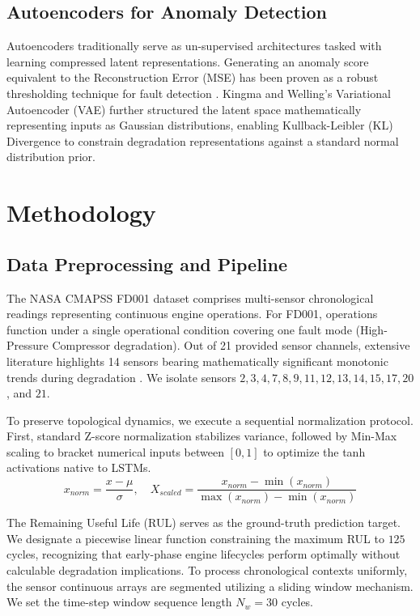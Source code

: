 \documentclass[conference]{IEEEtran}
\begin{document}
\subsection{Autoencoders for Anomaly Detection}
Autoencoders traditionally serve as un-supervised architectures tasked with learning compressed latent representations. Generating an anomaly score equivalent to the Reconstruction Error (MSE) has been proven as a robust thresholding technique for fault detection \cite{autoencoder_anomaly}. Kingma and Welling's Variational Autoencoder (VAE) \cite{vae_kl} further structured the latent space mathematically representing inputs as Gaussian distributions, enabling Kullback-Leibler (KL) Divergence to constrain degradation representations against a standard normal distribution prior.

\section{Methodology}
\subsection{Data Preprocessing and Pipeline}
The NASA CMAPSS FD001 dataset comprises multi-sensor chronological readings representing continuous engine operations. For FD001, operations function under a single operational condition covering one fault mode (High-Pressure Compressor degradation). Out of 21 provided sensor channels, extensive literature highlights 14 sensors bearing mathematically significant monotonic trends during degradation \cite{feature_selection}. We isolate sensors $2, 3, 4, 7, 8, 9, 11, 12, 13, 14, 15, 17, 20$, and $21$.

To preserve topological dynamics, we execute a sequential normalization protocol. First, standard Z-score normalization stabilizes variance, followed by Min-Max scaling to bracket numerical inputs between $[0,1]$ to optimize the tanh activations native to LSTMs.
\begin{equation}
    x_{norm} = \frac{x - \mu}{\sigma}, \quad X_{scaled} = \frac{x_{norm} - \min(x_{norm})}{\max(x_{norm}) - \min(x_{norm})}
\end{equation}

The Remaining Useful Life (RUL) serves as the ground-truth prediction target. We designate a piecewise linear function constraining the maximum RUL to $125$ cycles, recognizing that early-phase engine lifecycles perform optimally without calculable degradation implications.
To process chronological contexts uniformly, the sensor continuous arrays are segmented utilizing a sliding window mechanism. We set the time-step window sequence length $N_w = 30$ cycles.
\end{document}
